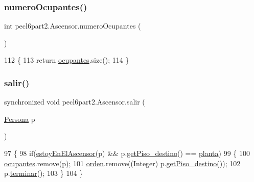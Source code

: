 \subsubsection{\texorpdfstring{numero\+Ocupantes()}{numeroOcupantes()}}
{\footnotesize\ttfamily int pecl6part2.\+Ascensor.\+numero\+Ocupantes (\begin{DoxyParamCaption}{ }\end{DoxyParamCaption})\hspace{0.3cm}{\ttfamily [inline]}}


\begin{DoxyCode}
112     \{
113         \textcolor{keywordflow}{return} \mbox{\hyperlink{classpecl6part2_1_1_ascensor_af4dd01a24c9588e94061d4e61045563a}{ocupantes}}.size();
114     \}
\end{DoxyCode}
\mbox{\label{classpecl6part2_1_1_ascensor_af74cb9df5027dc401dd20dbca538f7d6}} 
\subsubsection{\texorpdfstring{salir()}{salir()}}
{\footnotesize\ttfamily synchronized void pecl6part2.\+Ascensor.\+salir (\begin{DoxyParamCaption}\item[{\mbox{\hyperlink{classpecl6part2_1_1_persona}{Persona}}}]{p }\end{DoxyParamCaption})\hspace{0.3cm}{\ttfamily [inline]}}


\begin{DoxyCode}
97     \{
98         \textcolor{keywordflow}{if}(\mbox{\hyperlink{classpecl6part2_1_1_ascensor_a0ec994e509b6cddd706e1f6ee613d6f8}{estoyEnElAscensor}}(p) && p.\mbox{\hyperlink{classpecl6part1_1_1_persona_a82e55b6a597ab6cc0aa1d8fcfed9164b}{getPiso\_destino}}() == 
      \mbox{\hyperlink{classpecl6part2_1_1_ascensor_a66017643cc6554b17d447867a0c0d619}{planta}})
99         \{
100             \mbox{\hyperlink{classpecl6part2_1_1_ascensor_af4dd01a24c9588e94061d4e61045563a}{ocupantes}}.remove(p);
101             \mbox{\hyperlink{classpecl6part2_1_1_ascensor_a92a9c3265671bd3d2654626f62094cf9}{orden}}.remove((Integer) p.\mbox{\hyperlink{classpecl6part1_1_1_persona_a82e55b6a597ab6cc0aa1d8fcfed9164b}{getPiso\_destino}}());
102             p.\mbox{\hyperlink{classpecl6part1_1_1_persona_aa12dc3804209c0efb920b2fda7d1fbbd}{terminar}}();
103         \}
104     \}
\end{DoxyCode}


